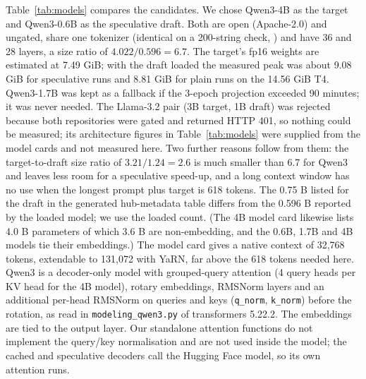 \documentclass[conference]{IEEEtran}
\newcommand{\code}[1]{\texttt{#1}}
\begin{document}
Table~\ref{tab:models} compares the candidates. We chose Qwen3-4B as the target and Qwen3-0.6B as the speculative draft. Both are open (Apache-2.0) and ungated, share one tokenizer (identical on a 200-string check, ) and have 36 and 28 layers, a size ratio of $4.022/0.596=6.7$. The target's fp16 weights are estimated at 7.49 GiB; with the draft loaded the measured peak was about 9.08 GiB for speculative runs and 8.81 GiB for plain runs on the 14.56 GiB T4. %
Qwen3-1.7B was kept as a fallback if the 3-epoch projection exceeded 90 minutes; it was never needed. The Llama-3.2 pair (3B target, 1B draft) was rejected because both repositories were gated and returned HTTP 401, so nothing could be measured; its architecture figures in Table~\ref{tab:models} were supplied from the model cards and not measured here. Two further reasons follow from them: the target-to-draft size ratio of $3.21/1.24=2.6$ is much smaller than 6.7 for Qwen3 and leaves less room for a speculative speed-up, and a long context window has no use when the longest prompt plus target is 618 tokens. The 0.75 B listed for the draft in the generated hub-metadata table differs from the 0.596 B reported by the loaded model; we use the loaded count. (The 4B model card likewise lists 4.0 B parameters of which 3.6 B are non-embedding, and the 0.6B, 1.7B and 4B models tie their embeddings.) The model card gives a native context of 32,768 tokens, extendable to 131,072 with YaRN, far above the 618 tokens needed here.
Qwen3 is a decoder-only model with grouped-query attention (4 query heads per KV head for the 4B model), rotary embeddings, RMSNorm layers and an additional per-head RMSNorm on queries and keys (\code{q\_norm}, \code{k\_norm}) before the rotation, as read in \code{modeling\_qwen3.py} of transformers 5.22.2. The embeddings are tied to the output layer. Our standalone attention functions do not implement the query/key normalisation and are not used inside the model; the cached and speculative decoders call the Hugging Face model, so its own attention runs.
\end{document}
